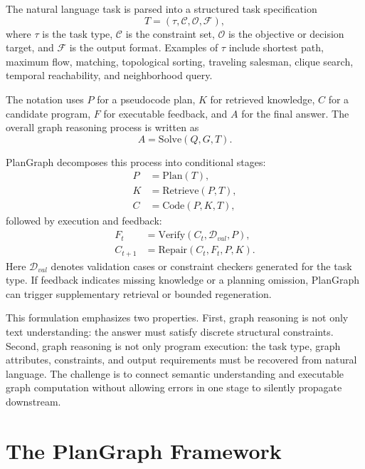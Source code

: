 \documentclass[pdflatex,sn-mathphys-num]{sn-jnl}
\theoremstyle{thmstyleone}
\theoremstyle{thmstyletwo}
\theoremstyle{thmstylethree}
\begin{document}
The natural language task is parsed into a structured task specification
\begin{equation}
T=(\tau,\mathcal{C},\mathcal{O},\mathcal{F}),
\end{equation}
where $\tau$ is the task type, $\mathcal{C}$ is the constraint set, $\mathcal{O}$ is the objective or decision target, and $\mathcal{F}$ is the output format. Examples of $\tau$ include shortest path, maximum flow, matching, topological sorting, traveling salesman, clique search, temporal reachability, and neighborhood query.

The notation uses $P$ for a pseudocode plan, $K$ for retrieved knowledge, $C$ for a candidate program, $F$ for executable feedback, and $A$ for the final answer. The overall graph reasoning process is written as
\begin{equation}
A = \mathrm{Solve}(Q,G,T).
\end{equation}

PlanGraph decomposes this process into conditional stages:
\begin{align}
P &= \mathrm{Plan}(T), \nonumber\\
K &= \mathrm{Retrieve}(P,T), \nonumber\\
C &= \mathrm{Code}(P,K,T),
\end{align}
followed by execution and feedback:
\begin{align}
F_t &= \mathrm{Verify}(C_t,\mathcal{D}_{val},P), \nonumber\\
C_{t+1} &= \mathrm{Repair}(C_t,F_t,P,K).
\end{align}
Here $\mathcal{D}_{val}$ denotes validation cases or constraint checkers generated for the task type. If feedback indicates missing knowledge or a planning omission, PlanGraph can trigger supplementary retrieval or bounded regeneration.

This formulation emphasizes two properties. First, graph reasoning is not only text understanding: the answer must satisfy discrete structural constraints. Second, graph reasoning is not only program execution: the task type, graph attributes, constraints, and output requirements must be recovered from natural language. The challenge is to connect semantic understanding and executable graph computation without allowing errors in one stage to silently propagate downstream.

\section{The PlanGraph Framework}\label{sec:framework}
\end{document}
